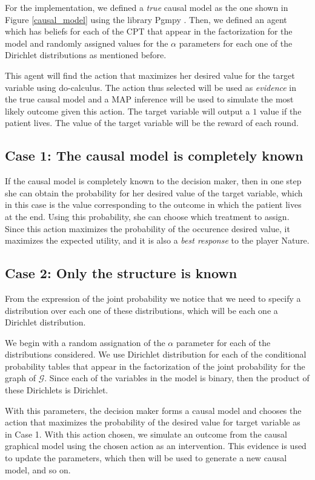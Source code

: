 \documentclass{article}
\begin{document}
For the implementation, we defined a \textit{true} causal model as the one shown in Figure \ref{causal_model} using the library Pgmpy \cite{ankan2015pgmpy}. Then, we defined an agent which has beliefs for each of the CPT that appear in the factorization for the model and randomly assigned values for the $\alpha$ parameters for each one of the Dirichlet distributions as mentioned before. 

This agent will find the action that maximizes her desired value for the target variable using do-calculus. The action thus selected will be used as \textit{evidence} in the true causal model and a MAP inference will be used to simulate the most likely outcome given this action. The target variable will output a $1$ value if the patient lives. The value of the target variable will be the reward of each round.

\subsection{Case 1: The causal model is completely known}
If the causal model is completely known to the decision maker, then in one step she can obtain the probability for her desired value of the target variable, which in this case is the value corresponding to the outcome in which the patient lives at the end. Using this probability, she can choose which treatment to assign. Since this action maximizes the probability of the occurence desired value, it maximizes the expected utility, and it is also a \textit{best response} to the player Nature.

\subsection{Case 2: Only the structure is known}
From the expression of the joint probability we notice that we need to specify a distribution over each one of these distributions, which will be each one a Dirichlet distribution.

We begin with a random assignation of the $\alpha$ parameter for each of the distributions considered. We use Dirichlet distribution for each of the conditional probability tables that appear in the factorization of the joint probability for the graph of $\mathcal{G}$. Since each of the variables in the model is binary, then the product of these Dirichlets is Dirichlet.

With this parameters, the decision maker forms a causal model and chooses the action that maximizes the probability of the desired value for target variable as in Case 1.  With this action chosen, we simulate an outcome from the causal graphical model using the chosen action as an intervention. This evidence is used to update the parameters, which then will be used to generate a new causal model, and so on.
\end{document}
